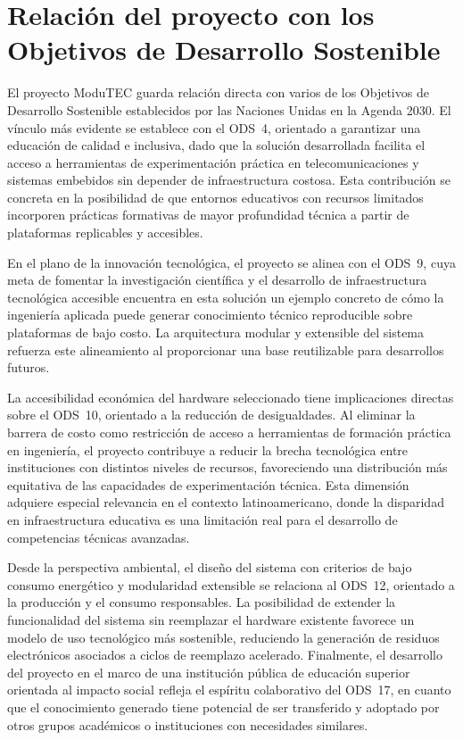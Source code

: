 \section{Relación del proyecto con los Objetivos de Desarrollo Sostenible}

El proyecto ModuTEC guarda relación directa con varios de los Objetivos
de Desarrollo Sostenible establecidos por las Naciones Unidas en la
Agenda 2030. El vínculo más evidente se establece con el ODS~4, orientado
a garantizar una educación de calidad e inclusiva, dado que la solución
desarrollada facilita el acceso a herramientas de experimentación práctica
en telecomunicaciones y sistemas embebidos sin depender de infraestructura
costosa. Esta contribución se concreta en la posibilidad de que entornos
educativos con recursos limitados incorporen prácticas formativas de mayor
profundidad técnica a partir de plataformas replicables y accesibles.

En el plano de la innovación tecnológica, el proyecto se alinea con el
ODS~9, cuya meta de fomentar la investigación científica y el desarrollo
de infraestructura tecnológica accesible encuentra en esta solución un
ejemplo concreto de cómo la ingeniería aplicada puede generar conocimiento
técnico reproducible sobre plataformas de bajo costo. La arquitectura
modular y extensible del sistema refuerza este alineamiento al proporcionar
una base reutilizable para desarrollos futuros.

La accesibilidad económica del hardware seleccionado tiene implicaciones
directas sobre el ODS~10, orientado a la reducción de desigualdades. Al
eliminar la barrera de costo como restricción de acceso a herramientas
de formación práctica en ingeniería, el proyecto contribuye a reducir la
brecha tecnológica entre instituciones con distintos niveles de recursos,
favoreciendo una distribución más equitativa de las capacidades de
experimentación técnica. Esta dimensión adquiere especial relevancia en
el contexto latinoamericano, donde la disparidad en infraestructura
educativa es una limitación real para el desarrollo de competencias
técnicas avanzadas.

Desde la perspectiva ambiental, el diseño del sistema con criterios de
bajo consumo energético y modularidad extensible se relaciona al ODS~12, orientado a la producción y el consumo responsables. La
posibilidad de extender la funcionalidad del sistema sin reemplazar el
hardware existente favorece un modelo de uso tecnológico más sostenible,
reduciendo la generación de residuos electrónicos asociados a ciclos de
reemplazo acelerado. Finalmente, el desarrollo del proyecto en el marco
de una institución pública de educación superior orientada al impacto
social refleja el espíritu colaborativo del ODS~17, en cuanto que el
conocimiento generado tiene potencial de ser transferido y adoptado por
otros grupos académicos o instituciones con necesidades similares.

